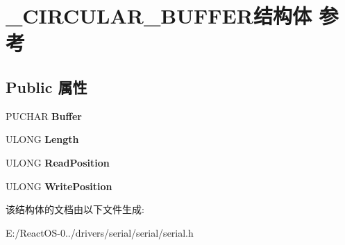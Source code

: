 \hypertarget{struct___c_i_r_c_u_l_a_r___b_u_f_f_e_r}{}\section{\+\_\+\+C\+I\+R\+C\+U\+L\+A\+R\+\_\+\+B\+U\+F\+F\+E\+R结构体 参考}
\label{struct___c_i_r_c_u_l_a_r___b_u_f_f_e_r}
\subsection*{Public 属性}
\begin{DoxyCompactItemize}
\item 
\mbox{\label{struct___c_i_r_c_u_l_a_r___b_u_f_f_e_r_a457606518c515dc7352d1967a6667d11}} 
P\+U\+C\+H\+AR {\bfseries Buffer}
\item 
\mbox{\label{struct___c_i_r_c_u_l_a_r___b_u_f_f_e_r_a33928c5a915577116094e824ac1860b3}} 
U\+L\+O\+NG {\bfseries Length}
\item 
\mbox{\label{struct___c_i_r_c_u_l_a_r___b_u_f_f_e_r_afad15565be8d540d4f555f5138f5f21a}} 
U\+L\+O\+NG {\bfseries Read\+Position}
\item 
\mbox{\label{struct___c_i_r_c_u_l_a_r___b_u_f_f_e_r_acc86373cf328d905d684fda9b6306cf5}} 
U\+L\+O\+NG {\bfseries Write\+Position}
\end{DoxyCompactItemize}


该结构体的文档由以下文件生成\+:\begin{DoxyCompactItemize}
\item 
E\+:/\+React\+O\+S-\/0../drivers/serial/serial/serial.\+h\end{DoxyCompactItemize}

